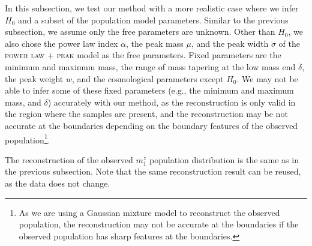 \documentclass[sn-aps, pdflatex]{sn-jnl}
\begin{document}
In this subsection, we test our method with a more realistic case where we infer $H_0$ and a subset of the population model parameters.
Similar to the previous subsection, we assume only the free parameters are unknown.
Other than $H_0$, we also chose the power law index $\alpha$, the peak mass $\mu$, and the peak width $\sigma$ of the \textsc{power law + peak} model as the free parameters.
Fixed parameters are the minimum and maximum mass, the range of mass tapering at the low mass end $\delta$, the peak weight $w$, and the cosmological parameters except $H_0$.
We may not be able to infer some of these fixed parameters (e.g., the minimum and maximum mass, and $\delta$) accurately with our method, as the reconstruction is only valid in the region where the samples are present, and the reconstruction may be not accurate at the boundaries depending on the boundary features of the observed population\footnote{As we are using a Gaussian mixture model to reconstruct the observed population, the reconstruction may not be accurate at the boundaries if the observed population has sharp features at the boundaries.}.

The reconstruction of the observed $m^z_1$ population distribution is the same as in the previous subsection.
Note that the same reconstruction result can be reused, as the data does not change.
\end{document}
